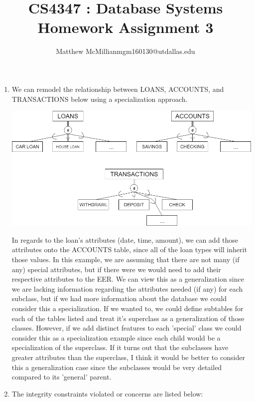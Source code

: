 \documentclass[12pt]{article}
\begin{document}
\title{CS4347 : Database Systems Homework Assignment 3}
\author{Matthew McMillianmgm160130@utdallas.edu}
\maketitle



\begin{enumerate}
	
	\item We can remodel the relationship between LOANS, ACCOUNTS, and TRANSACTIONS below using a specialization approach. 
		\begin{center}
			\includegraphics[scale=0.45]{eer3}
		\end{center} 
	In regards to the loan's attributes (date, time, amount), we can add those attributes onto the ACCOUNTS table, since all of the loan types will inherit those values. In this example, we are assuming that there are not many (if any) special attributes, but if there were we would need to add their respective attributes to the EER. We can view this as a generalization since we are lacking information regarding the attributes needed (if any) for each subclass, but if we had more information about the database we could consider this a specialization. If we wanted to, we could define subtables for each of the tables listed and treat it's superclass as a generalization of those classes. However, if we add distinct features to each 'special' class we could consider this as a specialization example since each child would be a specialization of the superclass. If it turns out that the subclasses have greater attributes  than the superclass, I think it would be better to consider this a generalization case since the subclasses would be very detailed compared to its 'general' parent.
	\pagebreak
	\item The integrity constraints violated or concerns are listed below:

\end{enumerate}
\end{document}
